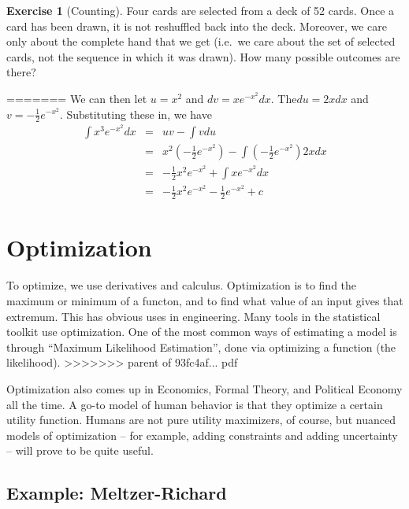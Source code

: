 \documentclass[]{book}
\theoremstyle{definition}
\theoremstyle{definition}
\theoremstyle{definition}
\newtheorem{exercise}{Exercise}[chapter]
\theoremstyle{remark}
\begin{document}
\begin{exercise}[Counting]
\protect\hypertarget{exr:counting1}{}{\label{exr:counting1} {} }
Four cards are selected from a deck of 52 cards. Once a card has been drawn, it is not reshuffled back into the deck. Moreover, we care only about the complete hand that we get (i.e.~we care about the set of selected cards, not the sequence in which it was drawn). How many possible outcomes are there?
\end{exercise}
=======
We can then let \(u=x^2\) and \(dv=x e^{-x^2}dx\). The\(du=2x dx\) and \(v=-\frac{1}{2}e^{-x^2}\). Substituting these in, we have
\begin{eqnarray}
                \int x^3 e^{-x^2} dx &=& u v - \int v du\nonumber\\
                &=& x^2 \left( -\frac{1}{2}e^{-x^2}\right) -\int \left(-\frac{1}{2}e^{-x^2}\right)2x dx\nonumber\\
                &=& -\frac{1}{2}x^2 e^{-x^2}+\int x e^{-x^2}dx\nonumber\\
                &=& -\frac{1}{2}x^2 e^{-x^2}-\frac{1}{2}e^{-x^2}+c\nonumber
\end{eqnarray}

\hypertarget{optim}{%
\chapter{Optimization}\label{optim}}

To optimize, we use derivatives and calculus. Optimization is to find the maximum or minimum of a functon, and to find what value of an input gives that extremum. This has obvious uses in engineering. Many tools in the statistical toolkit use optimization. One of the most common ways of estimating a model is through ``Maximum Likelihood Estimation'', done via optimizing a function (the likelihood).
>>>>>>> parent of 93fc4af... pdf

Optimization also comes up in Economics, Formal Theory, and Political Economy all the time. A go-to model of human behavior is that they optimize a certain utility function. Humans are not pure utility maximizers, of course, but nuanced models of optimization -- for example, adding constraints and adding uncertainty -- will prove to be quite useful.

\hypertarget{example-meltzer-richard}{%
\section*{Example: Meltzer-Richard}\label{example-meltzer-richard}}
\end{document}
